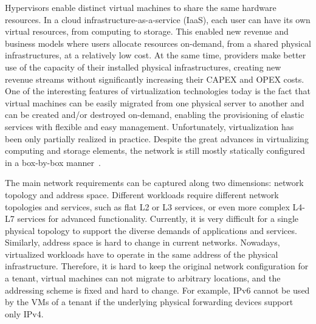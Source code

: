 Hypervisors enable distinct virtual machines to share the same hardware resources. In a 
cloud infrastructure-as-a-service (IaaS), each user can have its own virtual resources, from computing to 
storage. This enabled new revenue and business models where users allocate resources on-demand, from a shared 
physical infrastructures, at a relatively low cost.
At the same time, providers make better use of the capacity of their installed physical 
infrastructures, creating new revenue streams without significantly increasing their CAPEX and OPEX 
costs. One of the interesting features of virtualization technologies today is the fact that virtual 
machines can be easily migrated from one physical server to another and can 
be created and/or destroyed on-demand, enabling the provisioning of elastic services with flexible 
and easy management.
Unfortunately, virtualization has been only partially realized in practice. Despite the great advances 
in virtualizing computing and storage elements, the network is still mostly statically configured in a box-by-box manner~\cite{chowdhury2010}.

The main network requirements can be captured along two dimensions: network topology and address space.
Different workloads require different network topologies and services, such as flat L2 or L3 services, or even more complex L4-L7 
services for advanced functionality.
Currently, it is very difficult for a single physical topology to support the diverse demands 
of applications and services. Similarly, address space is hard to change in current networks. Nowadays, 
virtualized workloads have to operate in the same address of the physical infrastructure. 
Therefore, it is hard to keep the original network configuration for a tenant, virtual machines can not migrate to arbitrary locations, and the addressing scheme is fixed and hard to change. 
For example, IPv6 cannot be used by the VMs of a tenant if the underlying physical forwarding devices support only IPv4.


